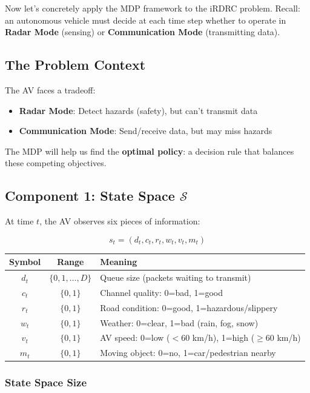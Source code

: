 \documentclass[12pt,a4paper]{article}
\begin{document}
Now let's concretely apply the MDP framework to the iRDRC problem. Recall: an autonomous vehicle must decide at each time step whether to operate in \textbf{Radar Mode} (sensing) or \textbf{Communication Mode} (transmitting data).

\subsection{The Problem Context}

The AV faces a tradeoff:
\begin{itemize}
    \item \textbf{Radar Mode}: Detect hazards (safety), but can't transmit data
    \item \textbf{Communication Mode}: Send/receive data, but may miss hazards
\end{itemize}

The MDP will help us find the \textbf{optimal policy}: a decision rule that balances these competing objectives.

\subsection{Component 1: State Space $\mathcal{S}$}

At time $t$, the AV observes six pieces of information:

\[
s_t = (d_t, c_t, r_t, w_t, v_t, m_t)
\]

\begin{table}[h]
\centering
\begin{tabular}{|c|c|l|}
\hline
\textbf{Symbol} & \textbf{Range} & \textbf{Meaning} \\
\hline
$d_t$ & $\{0, 1, \ldots, D\}$ & Queue size (packets waiting to transmit) \\
\hline
$c_t$ & $\{0, 1\}$ & Channel quality: 0=bad, 1=good \\
\hline
$r_t$ & $\{0, 1\}$ & Road condition: 0=good, 1=hazardous/slippery \\
\hline
$w_t$ & $\{0, 1\}$ & Weather: 0=clear, 1=bad (rain, fog, snow) \\
\hline
$v_t$ & $\{0, 1\}$ & AV speed: 0=low ($< 60$ km/h), 1=high ($\geq 60$ km/h) \\
\hline
$m_t$ & $\{0, 1\}$ & Moving object: 0=no, 1=car/pedestrian nearby \\
\hline
\end{tabular}
\end{table}

\subsubsection{State Space Size}
\end{document}
